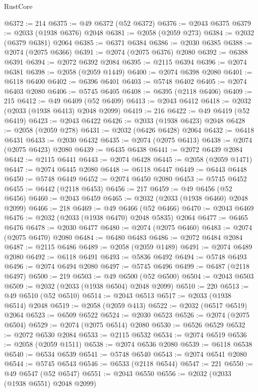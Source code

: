 \begin{lexlean}{RustCore}
\begin{coremodule}
@6372 := 214
@6375 := @49 @6372 (@52 @6372)
@6376 := @2043 @6375
@6379 := @2033 (@1938 @6376) @2048
@6381 := @2058 (@2059 @273)
@6384 := @2032 (@6379 @6381) @2064
@6385 := @6371 @6384
@6386 := @2030 @6385
@6388 := @2074 (@2075 @6366)
@6391 := @2074 (@2075 @6376) @2080
@6392 := @6388 @6391
@6394 := @2072 @6392 @2084
@6395 := @2115 @6394
@6396 := @2074 @6381
@6398 := @2058 (@2059 @1449)
@6400 := @2074 @6398 @2080
@6401 := @6118 @6400
@6402 := @6396 @6401
@6403 := @5748 @6402
@6405 := @2074 @6403 @2080
@6406 := @5745 @6405
@6408 := @6395 (@2118 @6406)
@6409 := 215
@6412 := @49 @6409 (@52 @6409)
@6413 := @2043 @6412
@6418 := @2032 (@2033 (@1938 @6413) @2048 @2099)
@6419 := 216
@6422 := @49 @6419 (@52 @6419)
@6423 := @2043 @6422
@6426 := @2033 (@1938 @6423) @2048
@6428 := @2058 (@2059 @278)
@6431 := @2032 (@6426 @6428) @2064
@6432 := @6418 @6431
@6433 := @2030 @6432
@6435 := @2074 (@2075 @6413)
@6438 := @2074 (@2075 @6423) @2080
@6439 := @6435 @6438
@6441 := @2072 @6439 @2084
@6442 := @2115 @6441
@6443 := @2074 @6428
@6445 := @2058 (@2059 @1471)
@6447 := @2074 @6445 @2080
@6448 := @6118 @6447
@6449 := @6443 @6448
@6450 := @5748 @6449
@6452 := @2074 @6450 @2080
@6453 := @5745 @6452
@6455 := @6442 (@2118 @6453)
@6456 := 217
@6459 := @49 @6456 (@52 @6456)
@6460 := @2043 @6459
@6465 := @2032 (@2033 (@1938 @6460) @2048 @2099)
@6466 := 218
@6469 := @49 @6466 (@52 @6466)
@6470 := @2043 @6469
@6476 := @2032 (@2033 (@1938 @6470) @2048 @5835) @2064
@6477 := @6465 @6476
@6478 := @2030 @6477
@6480 := @2074 (@2075 @6460)
@6483 := @2074 (@2075 @6470) @2080
@6484 := @6480 @6483
@6486 := @2072 @6484 @2084
@6487 := @2115 @6486
@6489 := @2058 (@2059 @1489)
@6491 := @2074 @6489 @2080
@6492 := @6118 @6491
@6493 := @5836 @6492
@6494 := @5748 @6493
@6496 := @2074 @6494 @2080
@6497 := @5745 @6496
@6499 := @6487 (@2118 @6497)
@6500 := 219
@6503 := @49 @6500 (@52 @6500)
@6504 := @2043 @6503
@6509 := @2032 (@2033 (@1938 @6504) @2048 @2099)
@6510 := 220
@6513 := @49 @6510 (@52 @6510)
@6514 := @2043 @6513
@6517 := @2033 (@1938 @6514) @2048
@6519 := @2058 (@2059 @413)
@6522 := @2032 (@6517 @6519) @2064
@6523 := @6509 @6522
@6524 := @2030 @6523
@6526 := @2074 (@2075 @6504)
@6529 := @2074 (@2075 @6514) @2080
@6530 := @6526 @6529
@6532 := @2072 @6530 @2084
@6533 := @2115 @6532
@6534 := @2074 @6519
@6536 := @2058 (@2059 @1511)
@6538 := @2074 @6536 @2080
@6539 := @6118 @6538
@6540 := @6534 @6539
@6541 := @5748 @6540
@6543 := @2074 @6541 @2080
@6544 := @5745 @6543
@6546 := @6533 (@2118 @6544)
@6547 := 221
@6550 := @49 @6547 (@52 @6547)
@6551 := @2043 @6550
@6556 := @2032 (@2033 (@1938 @6551) @2048 @2099)

\end{coremodule}
\end{lexlean}

